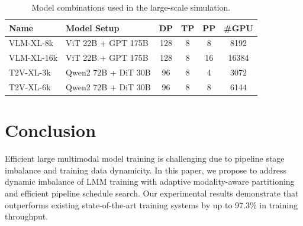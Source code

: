 \begin{table}[!t]
    \caption{
        Model combinations used in the large-scale simulation.
    }
    \label{table:xl-model-setup}

    \footnotesize
    \begin{tabular}{llcccc}
    \toprule
    \textbf{Name} & \textbf{Model Setup} & \textbf{DP} & \textbf{TP} & \textbf{PP} & \textbf{\#GPU} \\
    \midrule
    VLM-XL-8k & ViT 22B + GPT 175B & 128 & 8 & 8 & 8192 \\
    VLM-XL-16k & ViT 22B + GPT 175B & 128 & 8 & 16 & 16384 \\
    \midrule
    T2V-XL-3k & Qwen2 72B + DiT 30B & 96 & 8 & 4 & 3072 \\
    T2V-XL-6k & Qwen2 72B + DiT 30B & 96 & 8 & 8 & 6144 \\
    \bottomrule
    \end{tabular}
\end{table}

\section{Conclusion}

Efficient large multimodal model training is challenging due to pipeline stage imbalance and training data dynamicity.
In this paper, we propose {\sys} to address dynamic imbalance of LMM training
with adaptive modality-aware partitioning and efficient pipeline schedule search.
Our experimental results demonstrate that {\sys} outperforms existing state-of-the-art training systems by up to 97.3\% in training throughput.
